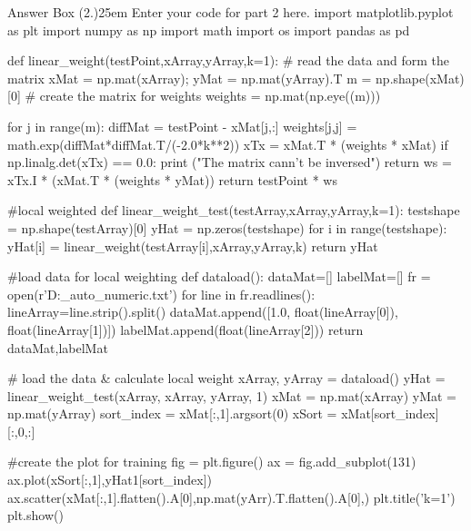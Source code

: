 \documentclass[12pt]{article}
\begin{document}
\begin{code}{Answer Box (2.)}{25em}
    Enter your code for part 2 here.
import matplotlib.pyplot as plt
import numpy as np
import math
import os
import pandas as pd

def linear_weight(testPoint,xArray,yArray,k=1):
    # read the data and form the matrix
    xMat = np.mat(xArray);   yMat = np.mat(yArray).T
    m = np.shape(xMat)[0]
    # create the matrix for weights
    weights = np.mat(np.eye((m)))

    for j in range(m):  
        diffMat = testPoint - xMat[j,:]
        weights[j,j] = math.exp(diffMat*diffMat.T/(-2.0*k**2))
    xTx = xMat.T * (weights * xMat)  
    if np.linalg.det(xTx) == 0.0:
        print ("The matrix cann't be inversed")
        return
    ws = xTx.I * (xMat.T * (weights * yMat))
    return testPoint * ws

#local weighted
def linear_weight_test(testArray,xArray,yArray,k=1):
    testshape = np.shape(testArray)[0]
    yHat = np.zeros(testshape)
    for i in range(testshape): 
        yHat[i] = linear_weight(testArray[i],xArray,yArray,k)
    return yHat

#load data for local weighting
def dataload():
    dataMat=[]
    labelMat=[]
    fr = open(r'D:\IAML\assessment\datasets\train_auto_numeric.txt')
    for line in fr.readlines():
        lineArray=line.strip().split()
        dataMat.append([1.0, float(lineArray[0]), float(lineArray[1])])
        labelMat.append(float(lineArray[2]))
    return dataMat,labelMat

# load the data & calculate local weight
xArray, yArray = dataload()
yHat = linear_weight_test(xArray, xArray, yArray, 1)
xMat = np.mat(xArray)
yMat = np.mat(yArray)
sort_index = xMat[:,1].argsort(0)
xSort = xMat[sort_index][:,0,:]

#create the plot for training
fig = plt.figure()
ax = fig.add_subplot(131)
ax.plot(xSort[:,1],yHat1[sort_index])
ax.scatter(xMat[:,1].flatten().A[0],np.mat(yArr).T.flatten().A[0],)
plt.title('k=1')
plt.show()

\end{code}




\end{document}
